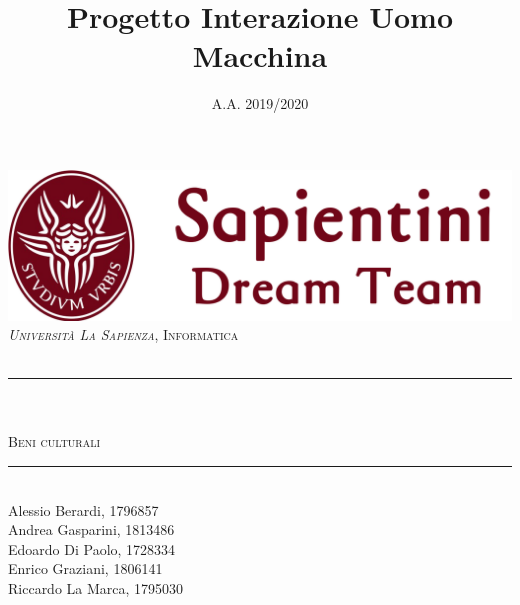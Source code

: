 \documentclass[11pt]{article}
\title{Progetto Interazione Uomo Macchina}
\date{A.A. 2019/2020}
\makeatletter
\def\projectName{Beni culturali}
\let\documentTitle\@title
\let\academicYear\@date
\makeatother
\begin{document}
\begin{titlepage}
	\centering
    \vspace*{0.5 cm}
    \includegraphics{images/logosapientini.png}\\[0.75 cm]
	\textsc{\textit{Università La Sapienza}, Informatica}\\[0.25 cm]
	\textsc{\academicYear}\\[0.5 cm]
	\rule{\linewidth}{0.2 mm} \\[0.4 cm]
	\textsc{\large \documentTitle}\\[0.4 cm]
	\textsc{\Huge \projectName}\\
	\rule{\linewidth}{0.2 mm} \\[1.5 cm]
	
	\large
	Alessio Berardi, 1796857\\[0.2 cm]
	Andrea Gasparini, 1813486\\[0.2 cm]
    Edoardo Di Paolo, 1728334\\[0.2 cm]
    Enrico Graziani, 1806141\\[0.2 cm]
    Riccardo La Marca, 1795030\\[0.2 cm]
\end{titlepage}

\tableofcontents
\pagebreak


\pagebreak

\end{document}
